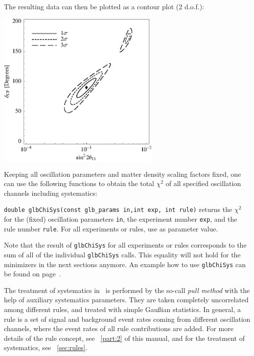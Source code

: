 {The resulting data can then be plotted as a contour plot (2 d.o.f.):
\begin{center}
\colorbox{white}{\includegraphics[width=8cm]{correx}}
\end{center}

}

Keeping all oscillation parameters and matter density scaling factors fixed,
 one can use the following functions to obtain the total $\chi^2$ of all 
 specified oscillation channels including systematics:
\begin{function} 
{\tt double glbChiSys(const glb\_params in,int exp, int rule)} returns
the $\chi^2$ for the (fixed) oscillation parameters {\tt in}, the
experiment number {\tt exp}, and the rule number {\tt rule}. For all
experiments or rules, use  as parameter value.
\end{function}
Note that the result of {\tt glbChiSys} for all experiments or rules
corresponds to the sum of all of the individual {\tt glbChiSys} calls. 
This equality will not hold for the minimizers in the next sections anymore. 
 An example how to use  {\tt glbChiSys} can be found on page~\pageref{ex:corrth13dcp}.  

 
The treatment of systematics in \GLOBES\ is performed by the so-call
{\em pull method} with the help of auxiliary systematics parameters.
They are taken completely uncorrelated among different rules, and treated with simple Gau\ss ian statistics. In general, a rule is a set 
of signal and background event rates coming from different oscillation
channels, where the event rates of all rule contributions are added.
For more details of the rule concept, see \Part~\ref{part:2} of this manual,
and for the treatment of systematics, see \Sec~\ref{sec:rules}.
 
